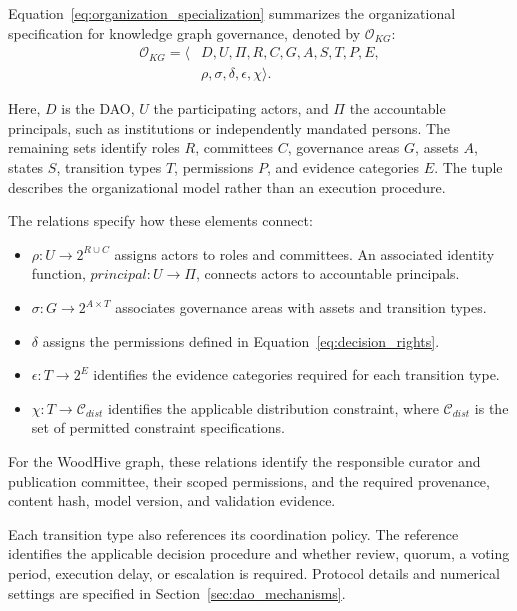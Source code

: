\documentclass[journal]{IEEEtran}
\begin{document}
Equation~\ref{eq:organization_specialization} summarizes
the organizational specification for knowledge graph
governance, denoted by $\mathcal{O}_{KG}$:
\begin{equation}
\label{eq:organization_specialization}
\begin{aligned}
\mathcal{O}_{KG}=\langle&D,U,\Pi,R,C,G,A,S,T,P,E,\\
&\rho,\sigma,\delta,\epsilon,\chi\rangle.
\end{aligned}
\end{equation}

Here, $D$ is the DAO, $U$ the participating actors, and
$\Pi$ the accountable principals, such as institutions or
independently mandated persons. The remaining sets identify
roles $R$, committees $C$, governance areas $G$, assets $A$,
states $S$, transition types $T$, permissions $P$, and
evidence categories $E$. The tuple describes the organizational
model rather than an execution procedure.

The relations specify how these elements connect:
\begin{itemize}
    \item $\rho:U\rightarrow 2^{R\cup C}$ assigns actors
    to roles and committees. An associated identity function,
    $principal:U\rightarrow\Pi$, connects actors to accountable
    principals.

    \item $\sigma:G\rightarrow 2^{A\times T}$ associates
    governance areas with assets and transition types.

    \item $\delta$ assigns the permissions defined in
    Equation~\ref{eq:decision_rights}.

    \item $\epsilon:T\rightarrow 2^E$ identifies the evidence
    categories required for each transition type.

    \item $\chi:T\rightarrow\mathcal{C}_{dist}$ identifies
    the applicable distribution constraint, where
    $\mathcal{C}_{dist}$ is the set of permitted constraint
    specifications.
\end{itemize}

For the WoodHive graph, these relations identify the responsible
curator and publication committee, their scoped permissions,
and the required provenance, content hash, model version,
and validation evidence.

Each transition type also references its coordination policy.
The reference identifies the applicable decision procedure
and whether review, quorum, a voting period, execution delay,
or escalation is required. Protocol details and numerical
settings are specified in Section~\ref{sec:dao_mechanisms}.
\end{document}
